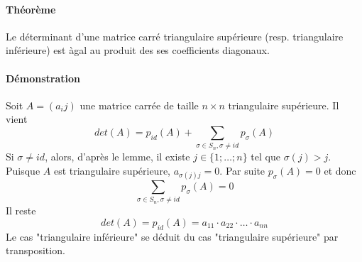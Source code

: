 \paragraph{Théorème} Le déterminant d'une matrice carré triangulaire supérieure (resp. triangulaire inférieure) est àgal au produit des ses coefficients diagonaux.

\paragraph{Démonstration}  Soit $A = (a_ij)$ une matrice carrée de taille $n \times n$ triangulaire supérieure. Il vient 
$$det(A) = p_{id}(A) + \sum_{\sigma \in S_n, \sigma \neq id} p_{\sigma}(A)$$
Si $\sigma \neq id$, alors, d'après le lemme, il existe $j \in \{1; \ldots; n \}$ tel que $\sigma(j) > j$. Puisque $A$ est triangulaire supérieure, $a_{\sigma(j) j} = 0$. Par suite $p_{\sigma}(A) = 0$ et donc 
$$\sum_{\sigma \in S_n, \sigma \neq id} p_{\sigma}(A) = 0$$
Il reste
$$det(A) = p_{id}(A) = a_{11} \cdot a_{22} \cdot \ldots \cdot a_{nn}$$
Le cas "triangulaire inférieure" se déduit du cas "triangulaire supérieure" par transposition.

%
